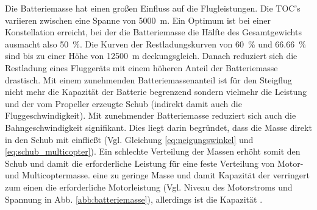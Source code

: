 Die Batteriemasse hat einen großen Einfluss auf die Flugleistungen. Die TOC's variieren zwischen eine Spanne von \SI{5000}{m}. Ein Optimum ist bei einer Konstellation erreicht, bei der die Batteriemasse die Hälfte des Gesamtgewichts ausmacht also \SI{50}{\%}. Die Kurven der Restladungskurven von \SI{60}{\%} und \SI{66.66}{\%} sind bis zu einer Höhe von \SI{12500}{m} deckungsgleich. Danach reduziert sich die Restladung eines Fluggeräts mit einem höheren Anteil der Batteriemasse drastisch. Mit einem zunehmenden Batteriemassenanteil ist für den Steigflug nicht mehr die Kapazität der Batterie begrenzend sondern vielmehr die Leistung und der vom Propeller erzeugte Schub (indirekt damit auch die Fluggeschwindigkeit). Mit zunehmender Batteriemasse reduziert sich auch die Bahngeschwindigkeit signifikant. Dies liegt darin begründet, dass die Masse direkt in den Schub mit einfließt (Vgl. Gleichung \ref{eq:neigungswinkel} und \ref{eq:schub_multicopter}). Ein schlechte Verteilung der Massen erhöht somit den Schub und damit die erforderliche Leistung für eine feste Verteilung von Motor- und Multicoptermasse. 
eine zu geringe Masse und damit Kapazität der verringert zum einen die erforderliche Motorleistung (Vgl. Niveau des Motorstroms und Spannung in Abb. \ref{abb:batteriemasse}), allerdings ist die Kapazität . 


